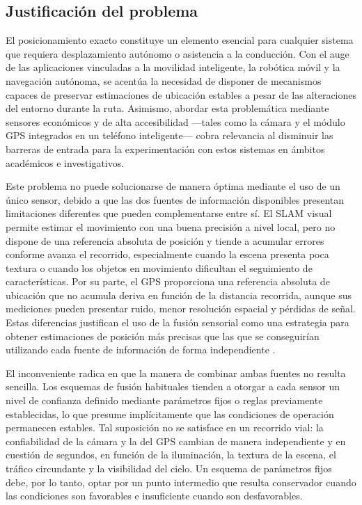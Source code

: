 \subsection{Justificación del problema}

El posicionamiento exacto constituye un elemento esencial para cualquier sistema que requiera desplazamiento autónomo o asistencia a la conducción.
Con el auge de las aplicaciones vinculadas a la movilidad inteligente, la robótica móvil y la navegación autónoma, se acentúa la necesidad de disponer de mecanismos capaces de preservar estimaciones de ubicación estables a pesar de las alteraciones del entorno durante la ruta.
Asimismo, abordar esta problemática mediante sensores económicos y de alta accesibilidad —tales como la cámara y el módulo GPS integrados en un teléfono inteligente— cobra relevancia al disminuir las barreras de entrada para la experimentación con estos sistemas en ámbitos académicos e investigativos.

Este problema no puede solucionarse de manera óptima mediante el uso de un único sensor, debido a que las dos fuentes de información disponibles presentan limitaciones diferentes que pueden complementarse entre sí.
El SLAM visual permite estimar el movimiento con una buena precisión a nivel local, pero no dispone de una referencia absoluta de posición y tiende a acumular errores conforme avanza el recorrido, especialmente cuando la escena presenta poca textura o cuando los objetos en movimiento dificultan el seguimiento de características.
Por su parte, el GPS proporciona una referencia absoluta de ubicación que no acumula deriva en función de la distancia recorrida, aunque sus mediciones pueden presentar ruido, menor resolución espacial y pérdidas de señal.
Estas diferencias justifican el uso de la fusión sensorial como una estrategia para obtener estimaciones de posición más precisas que las que se conseguirían utilizando cada fuente de información de forma independiente \cite{groves2013gnss}.

El inconveniente radica en que la manera de combinar ambas fuentes no resulta sencilla.
Los esquemas de fusión habituales tienden a otorgar a cada sensor un nivel de confianza definido mediante parámetros fijos o reglas previamente establecidas, lo que presume implícitamente que las condiciones de operación permanecen estables.
Tal suposición no se satisface en un recorrido vial: la confiabilidad de la cámara y la del GPS cambian de manera independiente y en cuestión de segundos, en función de la iluminación, la textura de la escena, el tráfico circundante y la visibilidad del cielo.
Un esquema de parámetros fijos debe, por lo tanto, optar por un punto intermedio que resulta conservador cuando las condiciones son favorables e insuficiente cuando son desfavorables.

